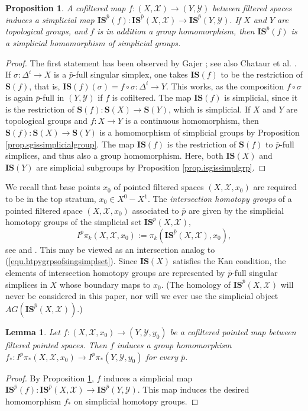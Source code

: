 \documentclass{amsart}
\newtheorem{lemma}[thm]{Lemma}
\newtheorem{prop}[thm]{Proposition}
\theoremstyle{definition}
\theoremstyle{remark}
\newcommand {\Xa}    {\ensuremath{\mathcal{X}}}
\newcommand {\Ya}    {\ensuremath{\mathcal{Y}}}
\newcommand {\bp}    {{\ensuremath{\bar{p}}}}
\newcommand {\sS}    {\mathbf{S}}
\newcommand {\sIS}   {\mathbf{IS}}
\begin{document}
\begin{prop} \label{prop.cofilteredinducesmaponsisp}
A cofiltered map $f: (X,\Xa) \to (Y,\Ya)$ between filtered spaces
induces a simplicial map
$\sIS^{\bar{p}} (f): \sIS^{\bar{p}} (X,\Xa) \to \sIS^{\bar{p}} (Y,\Ya).$
If $X$ and $Y$ are topological groups, and $f$ is
in addition a group homomorphism, then
$\sIS^{\bar{p}} (f)$ is a simplicial homomorphism of simplicial groups.
\end{prop}
\begin{proof}
The first statement has been observed by Gajer \cite[p. 946]{gajer};
see also Chataur et al. \cite[p. 11, Prop. 3.5]{chataurst}.
If $\sigma: \Delta^i \to X$ is a $\bp$-full singular simplex,
one takes $\sIS (f)$ to be the restriction of $\sS (f)$, that is,
$\sIS (f)(\sigma) = f \circ \sigma: \Delta^i \to Y.$
This works, as the composition
$f\circ \sigma$ is again $\bp$-full in $(Y,\Ya)$ if $f$ is cofiltered.
The map $\sIS (f)$ is simplicial, since it is the restriction of
$\sS (f): \sS (X) \to \sS (Y)$, which is simplicial.
If $X$ and $Y$ are topological groups and $f:X\to Y$
is a continuous homomorphism, then 
$\sS (f): \sS (X) \to \sS (Y)$ is a homomorphism of simplicial groups
by Proposition \ref{prop.sgissimplicialgroup}.
The map $\sIS (f)$ is the restriction of $\sS (f)$ to $\bp$-full simplices,
and thus also a group homomorphism.
Here, both $\sIS (X)$ and $\sIS (Y)$ are simplicial subgroups by
Proposition \ref{prop.isgissimplgrp}.
\end{proof}

We recall that base points $x_0$ of pointed filtered spaces
$(X,\Xa, x_0)$ are required to be in the top stratum, $x_0 \in X^0 - X^1$.
The \emph{intersection homotopy groups} of a pointed filtered space
$(X,\Xa, x_0)$ associated
to $\bp$ are given by the simplicial homotopy groups of the simplicial
set $\sIS^{\bar{p}} (X,\Xa),$
\[ I^\bp \pi_k (X,\Xa,x_0) := \pi_k (\sIS^{\bar{p}} (X,\Xa), x_0), \]
see \cite[p. 946]{gajer} and \cite[p. 16, Def. 4.1]{chataurst}.
This may be viewed as an intersection analog to (\ref{equ.htpygrpsofsingsimplset}).
Since $\sIS (X)$ satisfies the Kan condition, the elements of intersection
homotopy groups are represented by $\bp$-full singular simplices in $X$
whose boundary maps to $x_0$.
(The homology of $\sIS^{\bar{p}} (X,\Xa)$ will never be considered in this paper,
nor will we ever use the simplicial object $AG (\sIS^{\bar{p}} (X,\Xa))$.)

\begin{lemma} \label{lem.cofilteredonaginducesoninthtpygrps}
Let $f:(X,\Xa, x_0) \to (Y,\Ya, y_0)$ be a cofiltered pointed map between filtered 
pointed spaces.
Then $f$ induces a group homomorphism
$f_*: I^\bp \pi_* (X, \Xa, x_0) \to I^\bp \pi_* (Y, \Ya, y_0)$
for every $\bp$.
\end{lemma}
\begin{proof}
By Proposition \ref{prop.cofilteredinducesmaponsisp},
$f$ induces a simplicial map
$\sIS^{\bar{p}} (f): \sIS^{\bar{p}} (X,\Xa) \to \sIS^{\bar{p}} (Y,\Ya).$
This map induces the desired homomorphism $f_*$ on 
simplicial homotopy groups.
\end{proof}
\end{document}
